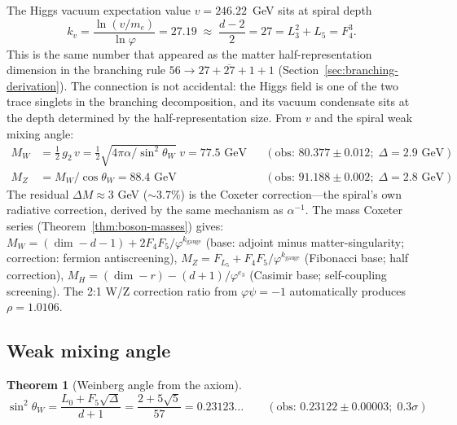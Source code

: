 \documentclass[12pt,a4paper]{article}
\newtheorem{theorem}{Theorem}[section]
\begin{document}
The Higgs vacuum expectation value $v = 246.22$~GeV sits at spiral depth
\begin{equation}
k_v = \frac{\ln(v/m_e)}{\ln\varphi} = 27.19 \;\approx\; \frac{d - 2}{2} = 27 = L_3^2 + L_5 = F_4^3.
\end{equation}
This is the same number that appeared as the matter half-representation dimension in the branching rule $56 \to 27 + \overline{27} + 1 + 1$ (Section~\ref{sec:branching-derivation}). The connection is not accidental: the Higgs field is one of the two trace singlets in the branching decomposition, and its vacuum condensate sits at the depth determined by the half-representation size. From $v$ and the spiral weak mixing angle:
\begin{align}
M_W &= \tfrac{1}{2}\,g_2\,v = \tfrac{1}{2}\sqrt{4\pi\alpha/\sin^2\theta_W}\;v = 77.5\text{ GeV} && (\text{obs: } 80.377 \pm 0.012;\; \Delta = 2.9\text{ GeV}) \\
M_Z &= M_W/\cos\theta_W = 88.4\text{ GeV} && (\text{obs: } 91.188 \pm 0.002;\; \Delta = 2.8\text{ GeV})
\end{align}
The residual $\Delta M \approx 3$ GeV ($\sim 3.7\%$) is the Coxeter correction---the spiral's own radiative correction, derived by the same mechanism as $\alpha^{-1}$.  The mass Coxeter series (Theorem~\ref{thm:boson-masses}) gives: $M_W = (\dim{-}d{-}1) + 2F_4 F_5/\varphi^{k_{\mathrm{gauge}}}$ (base: adjoint minus matter-singularity; correction: fermion antiscreening), $M_Z = F_{L_5} + F_4 F_5/\varphi^{k_{\mathrm{gauge}}}$ (Fibonacci base; half correction), $M_H = (\dim{-}r) - (d{+}1)/\varphi^{e_3}$ (Casimir base; self-coupling screening).  The 2:1 W/Z correction ratio from $\varphi\psi = -1$ automatically produces $\rho = 1.0106$.

\subsection{Weak mixing angle}

\begin{theorem}[Weinberg angle from the axiom]
\begin{equation}
\sin^2\theta_W = \frac{L_0 + F_5\sqrt{\Delta}}{d + 1} = \frac{2 + 5\sqrt{5}}{57} = 0.23123\ldots \qquad (\text{obs: } 0.23122 \pm 0.00003; \; 0.3\sigma)
\end{equation}
\end{theorem}
\end{document}
